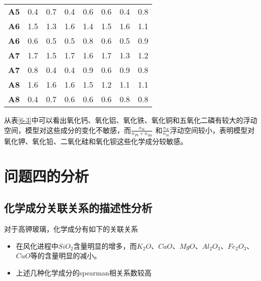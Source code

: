\documentclass[withoutpreface,bwprint]{cumcmthesis} %
\begin{document}
\begin{table}[!h]
\begin{tabular}{@{}cccccccc@{}}
		\textbf{A5} & 0.4               & 0.7                 & 0.4                 & 0.6               & 0.6                  & 0.4                                   & 0.8                              \\
		\textbf{A6} & 1.5               & 1.3                 & 1.6                 & 1.4               & 1.5                  & 1.6                                   & 1.1                              \\
		\textbf{A6} & 0.6               & 0.5                 & 0.5                 & 0.8               & 0.6                  & 0.5                                   & 0.9                              \\
		\textbf{A7} & 1.7               & 1.5                 & 1.7                 & 1.6               & 1.7                  & 1.3                                   & 1.2                              \\
		\textbf{A7} & 0.8               & 0.4                 & 0.4                 & 0.9               & 0.6                  & 0.9                                   & 0.8                              \\
		\textbf{A8} & 1.6               & 1.6                 & 1.6                 & 1.5               & 1.2                  & 1.1                                   & 1.1                              \\
		\textbf{A8} & 0.4               & 0.7                 & 0.6                 & 0.6               & 0.6                  & 0.8                                   & 0.8                              \\ \bottomrule
	\end{tabular}
\end{table}

从表\ref{6-3}中可以看出氧化钙、氧化铝、氧化铁、氧化铜和五氧化二磷有较大的浮动空间，模型对这些成分的变化不敏感，而$\frac{n_K}{n_{Pb}+n_{Ba}}$ 和$\frac{n_{K}}{n_{Si}} $浮动空间较小，表明模型对氧化钾、氧化铅、二氧化硅和氧化钡这些化学成分较敏感。


\section{问题四的分析}
\subsection{化学成分关联关系的描述性分析}

对于高钾玻璃，化学成分有如下的关联关系
\begin{itemize}
	\item 在风化进程中$SiO_{2}$含量明显的增多，而$K_{2}O$、$CaO$、$MgO$、$Al_{2}O_{3}$、$Fe_{2}O_{3}$、$CuO$等的含量明显的减小。
	\item 上述几种化学成分的spearman相关系数较高
\end{itemize}
\end{document}
